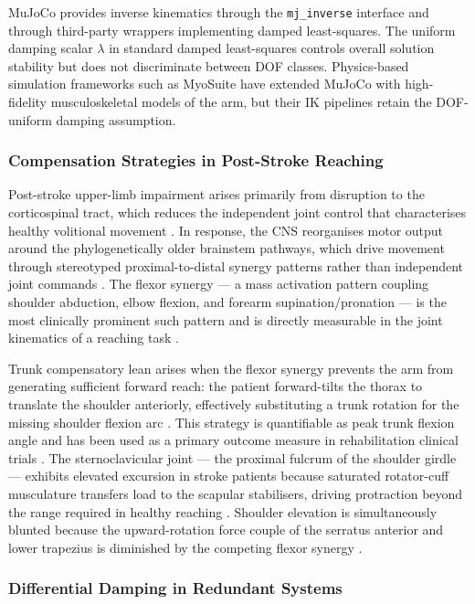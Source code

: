 \documentclass[journal,10pt,twocolumn]{IEEEtran}
\begin{document}
MuJoCo \cite{todorov2012} provides inverse kinematics through the
\texttt{mj\_inverse} interface and through third-party wrappers implementing
damped least-squares. The uniform damping scalar $\lambda$ in standard
damped least-squares controls overall solution stability but does not
discriminate between DOF classes. Physics-based simulation frameworks such
as MyoSuite \cite{caggiano2022} have extended MuJoCo with high-fidelity
musculoskeletal models of the arm, but their IK pipelines retain the
DOF-uniform damping assumption.

\subsubsection{Compensation Strategies in Post-Stroke Reaching}

Post-stroke upper-limb impairment arises primarily from disruption to the
corticospinal tract, which reduces the independent joint control that
characterises healthy volitional movement \cite{dewald1995}.
In response, the CNS reorganises motor output around the phylogenetically
older brainstem pathways, which drive movement through stereotyped proximal-to-distal
synergy patterns rather than independent joint commands \cite{cirstea2000}.
The flexor synergy --- a mass activation pattern coupling shoulder abduction,
elbow flexion, and forearm supination/pronation --- is the most clinically
prominent such pattern and is directly measurable in the joint kinematics of
a reaching task \cite{dewald1995}.

Trunk compensatory lean arises when the flexor synergy prevents the arm from
generating sufficient forward reach: the patient forward-tilts the thorax to
translate the shoulder anteriorly, effectively substituting a trunk rotation
for the missing shoulder flexion arc \cite{cirstea2000}. This strategy is
quantifiable as peak trunk flexion angle and has been used as a primary outcome
measure in rehabilitation clinical trials \cite{mccrea2005}.
The sternoclavicular joint --- the proximal fulcrum of the shoulder girdle ---
exhibits elevated excursion in stroke patients because saturated rotator-cuff
musculature transfers load to the scapular stabilisers, driving protraction
beyond the range required in healthy reaching \cite{mccrea2005}.
Shoulder elevation is simultaneously blunted because the upward-rotation force
couple of the serratus anterior and lower trapezius is diminished by the
competing flexor synergy \cite{wagner2007}.

\subsubsection{Differential Damping in Redundant Systems}
\end{document}
